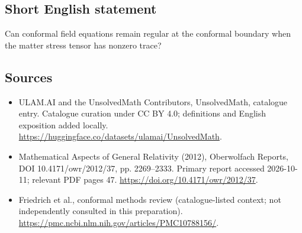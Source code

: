 \documentclass[11pt]{article}
\begin{document}
\subsection{Short English statement}
Can conformal field equations remain regular at the conformal boundary when the matter stress tensor has nonzero trace?
\subsection{Sources}
\begin{itemize}
\item[\hypertarget{source:statement:1}{S1}] ULAM.AI and the UnsolvedMath Contributors, UnsolvedMath, catalogue entry. Catalogue curation under CC BY 4.0; definitions and English exposition added locally.
\url{https://huggingface.co/datasets/ulamai/UnsolvedMath}.
\item[\hypertarget{source:statement:2}{S2}] Mathematical Aspects of General Relativity (2012), Oberwolfach Reports, DOI 10.4171/owr/2012/37, pp. 2269--2333. Primary report accessed 2026-10-11; relevant PDF pages 47.
\url{https://doi.org/10.4171/owr/2012/37}.
\item[\hypertarget{source:statement:3}{S3}] Friedrich et al., conformal methods review (catalogue-listed context; not independently consulted in this preparation).
\url{https://pmc.ncbi.nlm.nih.gov/articles/PMC10788156/}.
\end{itemize}
\label{end:statement}
\end{document}
